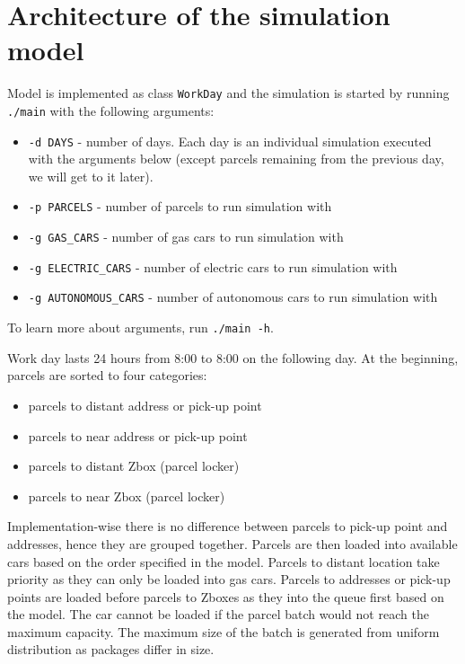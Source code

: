 \documentclass[a4paper, 11pt, a4paper]{article}
\begin{document}
\section{Architecture of the simulation model}

Model is implemented as class \texttt{WorkDay} and the simulation is started by running
\texttt{./main} with the following arguments:
\begin{itemize}
    \item \texttt{-d DAYS} - number of days. Each day is
    an individual simulation executed with the arguments below (except parcels remaining from the previous day, we
    will get to it later).
    \item \texttt{-p PARCELS} - number of parcels to run simulation with
    \item \texttt{-g GAS\_CARS} - number of gas cars to run simulation with
    \item \texttt{-g ELECTRIC\_CARS} - number of electric cars to run simulation with
    \item \texttt{-g AUTONOMOUS\_CARS} - number of autonomous cars to run simulation with
\end{itemize}
To learn more about arguments, run \texttt{./main -h}.

\newpage

\noindent Work day lasts 24 hours from 8:00 to 8:00 on the following day.
At the beginning, parcels are sorted to four categories:
\begin{itemize}
    \item parcels to distant address or pick-up point
    \item parcels to near address or pick-up point
    \item parcels to distant Zbox (parcel locker)
    \item parcels to near Zbox (parcel locker)
\end{itemize}
Implementation-wise there is no difference between parcels to pick-up point and
addresses, hence they are grouped together.
Parcels are then loaded into available cars based on the order specified in the
model.
Parcels to distant location take priority as they can only be loaded into gas
cars.
Parcels to addresses or pick-up points are loaded before parcels to Zboxes as
they into the queue first based on the model.
The car cannot be loaded if the parcel batch would not reach the maximum
capacity. The maximum size of the batch
is generated from uniform distribution as packages differ in size.
\end{document}
